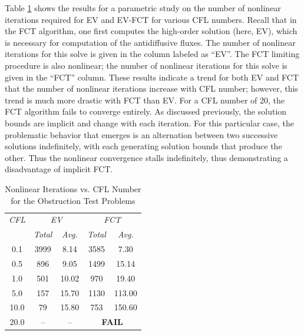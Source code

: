 Table \ref{tab:obstruction_iterations} shows the results for a parametric study
on the number of nonlinear iterations required for EV and EV-FCT for various
CFL numbers. Recall that in the FCT algorithm, one first computes the high-order solution
(here, EV), which is necessary for computation of the antidiffusive fluxes.
The number of nonlinear iterations for this solve is given in the column
labeled as ``EV''. The FCT limiting procedure is also nonlinear; the number
of nonlinear iterations for this solve is given in the ``FCT'' column.
These results indicate a trend for both EV and FCT that the number of nonlinear
iterations increase with CFL number; however, this trend is much more drastic
with FCT than EV. For a CFL number of 20, the FCT algorithm fails to converge
entirely. As discussed previously, the solution bounds are implicit and change
with each iteration. For this particular case, the problematic behavior that
emerges is an alternation between two successive solutions indefinitely, with each generating
solution bounds that produce the other. Thus the nonlinear convergence stalls
indefinitely, thus demonstrating a disadvantage of implicit FCT.
\begin{table}[htb]\caption{Nonlinear Iterations vs. CFL Number for the
  Obstruction Test Problems}
\label{tab:obstruction_iterations}
\centering
\begin{tabular}{c c c c c}\hline
\emph{CFL} & \multicolumn{2}{c}{\emph{EV}} & \multicolumn{2}{c}{\emph{FCT}}\\
           & \emph{Total} & \emph{Avg.}    &  \emph{Total} & \emph{Avg.}\\\hline
0.1  & 3999 &  8.14 & 3585 &   7.30\\
0.5  &  896 &  9.05 & 1499 &  15.14\\
1.0  &  501 & 10.02 &  970 &  19.40\\
5.0  &  157 & 15.70 & 1130 & 113.00\\
10.0 &   79 & 15.80 &  753 & 150.60\\
20.0 &   -- &    -- & \multicolumn{2}{c}{\textbf{FAIL}}\\
\hline\end{tabular}
\end{table}

\clearpage

